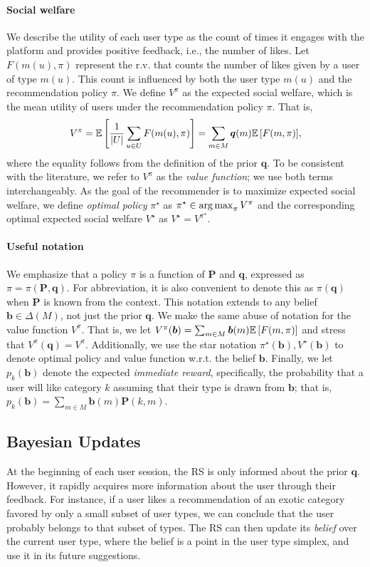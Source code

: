 \paragraph{Social welfare}
We describe the utility of each user type as the count of times it engages with the platform and provides positive feedback, i.e., the number of likes. Let $F(m(u),\pi)$ represent the r.v. that counts the number of likes given by a user of type $m(u)$. This count is influenced by both the user type $m(u)$ and the recommendation policy $\pi$. We define $V^\pi$ as the expected social welfare, which is the mean utility of users under the recommendation policy $\pi$. That is,
\begin{equation*}
    \Scale[0.97
    ]{V^\pi = \E{\frac{1}{\abs{U}}\sum_{u \in U} F(m(u),\pi)} = \sum_{m \in M}\bm q(m)\E{F(m,\pi)}},
\end{equation*}
where the equality follows from the definition of the prior $\bm q$. To be consistent with the literature, we refer to $V^\pi$ as the \emph{value function}; we use both terms interchangeably.
As the goal of the recommender is to maximize expected social welfare, we define \emph{optimal policy} $\pi^\star$ as $\pi^\star \in \operatorname*{arg\,max}_{\pi} V^\pi$ and the corresponding optimal expected social welfare $V^\star$ as $V^\star = V^{\pi^\star}$.

\paragraph{Useful notation}
We emphasize that a policy $\pi$ is a function of $\bm {P}$ and $\bm {q}$, expressed as $\pi=\pi(\bm P, \bm q)$. For abbreviation, it is also convenient to denote this as $\pi(\bm q)$ when $\bm P$ is known from the context. This notation extends to any belief $\bm b \in \Delta(M)$, not just the prior $\bm q$. We make the same abuse of notation for the value function $V^\pi$. That is, we let $V^\pi(\bm b)=\sum_{m \in M}\bm b(m) \mathbb{E}\left[ F(m,\pi) \right]$ and stress that $V^\pi(\bm q)=V^\pi$. Additionally, we use the star notation $\pi^\star(\bm b), V^\star(\bm b)$ to denote optimal policy and value function w.r.t. the belief $\bm b$. Finally, we let $p_{k}(\bm{b})$ denote the expected \emph{immediate reward}, specifically, the probability that a user will like category $k$ assuming that their type is drawn from $\bm{b}$; that is, $p_{k}(\bm{b}) = \sum_{m \in M} \bm{b}(m) \bm{P}(k, m)$.

\subsection{Bayesian Updates}
At the beginning of each user session, the RS is only informed about the prior $\bm q$. However, it rapidly acquires more information about the user through their feedback. For instance, if a user likes a recommendation of an exotic category favored by only a small subset of user types, we can conclude that the user probably belongs to that subset of types. The RS can then update its \emph{belief} over the current user type, where the belief is a point in the user type simplex, and use it in its future suggestions. 

